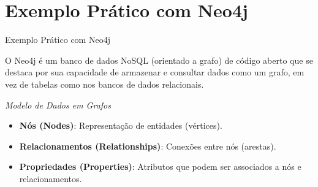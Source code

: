 \documentclass{if-beamer}
\begin{document}
\section{Exemplo Prático com Neo4j}

\begin{frame}{Exemplo Prático com Neo4j} 
	
	O Neo4j é um banco de dados NoSQL (orientado a grafo) de código aberto que se destaca por sua capacidade de armazenar e consultar dados como um grafo, em vez de tabelas como nos bancos de dados relacionais.
	
	\emph{Modelo de Dados em Grafos}
	\vspace{0.3cm}
	\begin{itemize}
		\item \textbf{Nós (Nodes)}: Representação de entidades (vértices).
		\item \textbf{Relacionamentos (Relationships)}: Conexões entre nós (arestas).
		\item \textbf{Propriedades (Properties)}: Atributos que podem ser associados a nós e relacionamentos.
	\end{itemize}
	
\end{frame}
\end{document}
